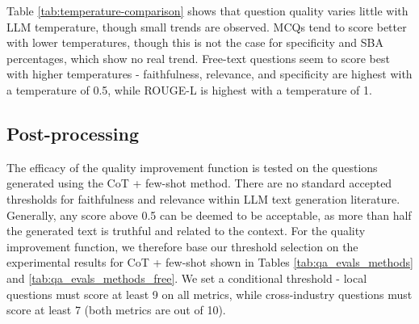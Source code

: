 Table \ref{tab:temperature-comparison} shows that question quality varies little with LLM temperature, though small trends are observed. MCQs tend to score better with lower temperatures, though this is not the case for specificity and SBA percentages, which show no real trend. Free-text questions seem to score best with higher temperatures - faithfulness, relevance, and specificity are highest with a temperature of 0.5, while ROUGE-L is highest with a temperature of 1.

\subsection{Post-processing}

The efficacy of the quality improvement function is tested on the questions generated using the CoT + few-shot method. There are no standard accepted thresholds for faithfulness and relevance within LLM text generation literature. Generally, any score above 0.5 can be deemed to be acceptable, as more than half the generated text is truthful and related to the context. For the quality improvement function, we therefore base our threshold selection on the experimental results for CoT + few-shot shown in Tables \ref{tab:qa_evals_methods} and \ref{tab:qa_evals_methods_free}. We set a conditional threshold - local questions must score at least 9 on all metrics, while cross-industry questions must score at least 7 (both metrics are out of 10). \\


